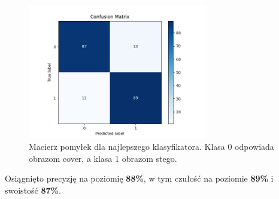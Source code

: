 \begin{figure}[ht!]
	\centering
	\includegraphics[width=0.7\textwidth]{./img/dct_match_confusion_matrx.png}
	\caption{\label{fig:dct_match_confusion_matrix} Macierz pomyłek dla najlepszego klasyfikatora. Klasa 0 odpowiada obrazom cover, a klasa 1 obrazom stego.}
\end{figure}

Osiągnięto precyzję na poziomię \textbf{88\%}, w tym czułość na poziomie \textbf{89\%} i swoistość \textbf{87\%}.
